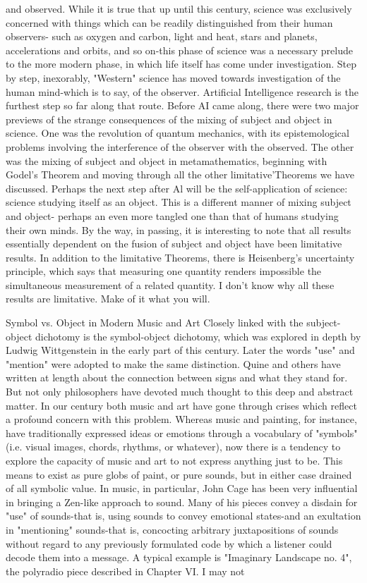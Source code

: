 and observed. While it is true that up until this century, science was exclusively
concerned with things which can be readily distinguished from their human observers-
such as oxygen and carbon, light and heat, stars and planets, accelerations and orbits, and
so on-this phase of science was a necessary prelude to the more modern phase, in which
life itself has come under investigation. Step by step, inexorably, "Western" science has
moved towards investigation of the human mind-which is to say, of the observer.
Artificial Intelligence research is the furthest step so far along that route. Before AI came
along, there were two major previews of the strange consequences of the mixing of
subject and object in science. One was the revolution of quantum mechanics, with its
epistemological problems involving the interference of the observer with the observed.
The other was the mixing of subject and object in metamathematics, beginning with
Godel's Theorem and moving through all the other limitative'Theorems we have
discussed. Perhaps the next step after Al will be the self-application of science: science
studying itself as an object. This is a different manner of mixing subject and object-
perhaps an even more tangled one than that of humans studying their own minds.
         By the way, in passing, it is interesting to note that all results essentially
dependent on the fusion of subject and object have been limitative results. In addition to
the limitative Theorems, there is Heisenberg's uncertainty principle, which says that
measuring one quantity renders impossible the simultaneous measurement of a related
quantity. I don't know why all these results are limitative. Make of it what you will.

                 Symbol vs. Object in Modern Music and Art
Closely linked with the subject-object dichotomy is the symbol-object dichotomy, which
was explored in depth by Ludwig Wittgenstein in the early part of this century. Later the
words "use" and "mention" were adopted to make the same distinction. Quine and others
have written at length about the connection between signs and what they stand for. But
not only philosophers have devoted much thought to this deep and abstract matter. In our
century both music and art have gone through crises which reflect a profound concern
with this problem. Whereas music and painting, for instance, have traditionally expressed
ideas or emotions through a vocabulary of "symbols" (i.e. visual images, chords,
rhythms, or whatever), now there is a tendency to explore the capacity of music and art to
not express anything just to be. This means to exist as pure globs of paint, or pure sounds,
but in either case drained of all symbolic value.
        In music, in particular, John Cage has been very influential in bringing a Zen-like
approach to sound. Many of his pieces convey a disdain for "use" of sounds-that is, using
sounds to convey emotional states-and an exultation in "mentioning" sounds-that is,
concocting arbitrary juxtapositions of sounds without regard to any previously formulated
code by which a listener could decode them into a message. A typical example is
"Imaginary Landscape no. 4", the polyradio piece described in Chapter VI. I may not




